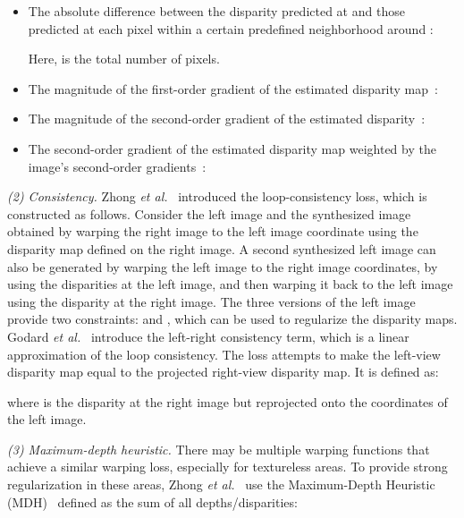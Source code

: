 \documentclass[10pt,journal,compsoc]{IEEEtran}
\newcommand{\etal}{\emph{et al.}}
\newcommand{\noi}{\noindent}
\begin{document}
\begin{itemize}
	\item  The absolute difference between the disparity predicted at  and those predicted at each pixel  within a certain predefined neighborhood  around   : 

	Here,  is the total number of pixels. 
	\item The magnitude of the first-order gradient  of the estimated disparity map~\cite{yang2018segstereo}:
			
		
	\item The  magnitude of the second-order gradient of the estimated disparity~\cite{zhou2017unsupervised,vijayanarasimhan2017sfm}: 		
			
	
	\item The second-order gradient of the estimated disparity map  weighted by the image's second-order gradients~\cite{zhong2017self}:
		
\end{itemize}	
			

\vspace{6pt}
\noi\textit{(2) Consistency. } Zhong \etal~\cite{zhong2017self}  introduced the loop-consistency loss, which is constructed as follows. Consider the left image  and the  synthesized image  obtained by warping the right image to the left image coordinate using the disparity map defined on the right image. A second synthesized left image    can also be generated by warping the left image to the right image coordinates, by using the disparities at the left image, and then warping it back to the left image using the disparity at the right image. The three versions of the left image provide two constraints:  and , which can be used to regularize the disparity maps. Godard \etal~\cite{godard2017unsupervised}  introduce the left-right consistency term, which is a linear approximation of the loop consistency. The loss attempts to make the left-view disparity map  equal to the projected right-view disparity map. It is defined as: 
		

\noi where  is the disparity at the right image but reprojected onto the coordinates of the left image. 
		
\vspace{6pt}
\noi\textit{(3) Maximum-depth heuristic. }  There may be multiple warping functions that achieve a similar warping loss, especially for textureless areas. To provide strong regularization in these areas, Zhong \etal~\cite{zhong2017self}  use the Maximum-Depth Heuristic (MDH)~\cite{perriollat2011monocular}  defined as the sum of all depths/disparities:
		
\end{document}
